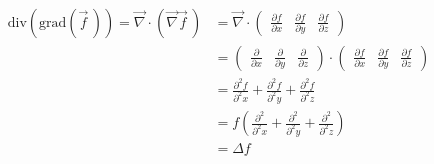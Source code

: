   \begin{align*}
  \text{div}(\text{grad}(\vec f\,)) = \vec\nabla \cdot \left(\vec\nabla \vec f\,\right) 
    & = 
      \vec\nabla \cdot
      \begin{pmatrix} 
        \frac{\partial f}{\partial x} &
        \frac{\partial f}{\partial y} &
        \frac{\partial f}{\partial z}
      \end{pmatrix} \\
    & =
      \begin{pmatrix} 
        \frac{\partial}{\partial x} &
        \frac{\partial}{\partial y} &
        \frac{\partial}{\partial z}
      \end{pmatrix}
      \cdot
      \begin{pmatrix} 
        \frac{\partial f}{\partial x} &
        \frac{\partial f}{\partial y} &
        \frac{\partial f}{\partial z}
      \end{pmatrix} \\
    & =  
      \frac{\partial^2 f}{\partial^2 x} +
      \frac{\partial^2 f}{\partial^2 y} +
      \frac{\partial^2 f}{\partial^2 z} \\
    & = f
      \left(
      \frac{\partial^2}{\partial^2 x} +
      \frac{\partial^2}{\partial^2 y} +
      \frac{\partial^2}{\partial^2 z}
      \right) \\
    & = \Delta f
  \end{align*}
